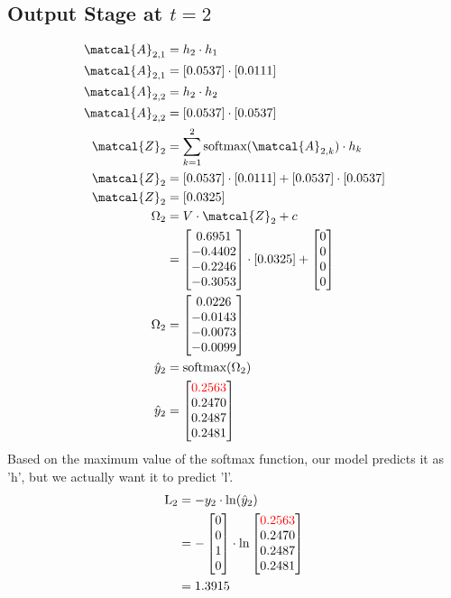 \documentclass{article}
\begin{document}
\subsection*{Output Stage at $t=2$}
\begin{align*}
\matcal{A}_{2,1} &= h_2 \cdot h_1 \\
\matcal{A}_{2,1} &= [0.0537] \cdot [0.0111] \\
\matcal{A}_{2,2} &= h_2 \cdot h_2 \\
\matcal{A}_{2,2} &= [0.0537] \cdot [0.0537] \\
\matcal{Z}_2 &= \sum_{k=1}^2 \text{softmax}(\matcal{A}_{2,k}) \cdot h_k \\
\matcal{Z}_2 &= [0.0537] \cdot [0.0111] + [0.0537] \cdot [0.0537]\\
\matcal{Z}_2 &= [0.0325] \\
\Omega_2 &= V \cdot \matcal{Z}_2 + c \\
 &= \begin{bmatrix}
  0.6951 \\
 -0.4402 \\
 -0.2246 \\
 -0.3053
\end{bmatrix} \cdot [0.0325] + \begin{bmatrix} 0 \\ 0 \\ 0 \\ 0\end{bmatrix}\\
\Omega_2 &= \begin{bmatrix}
 0.0226 \\
-0.0143 \\
-0.0073 \\
-0.0099
\end{bmatrix} \\
\hat{y}_2 &= \text{softmax}(\Omega_2) \\
\hat{y}_2 &= \begin{bmatrix}
\textcolor{red}{0.2563} \\
0.2470 \\
0.2487 \\
0.2481
\end{bmatrix} \\
\end{align*}
Based on the maximum value of the softmax function, our model predicts it as 'h', but we actually want it to predict 'l'.
\begin{align*}
    \text{L}_{2} & = -y_2 \cdot \ln(\hat{y}_2) \\
    &=-\begin{bmatrix} 0 \\ 0 \\ 1 \\ 0 \end{bmatrix} \cdot \ln{\begin{bmatrix}
\textcolor{red}{0.2563} \\
0.2470 \\
0.2487 \\
0.2481
\end{bmatrix}}\\
    &=1.3915
\end{align*}
\end{document}
